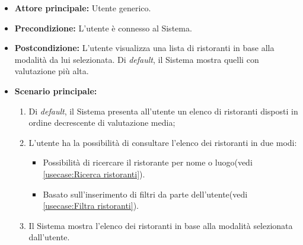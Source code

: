 \label{usecase:Visualizzazione elenco ristoranti}
\begin{itemize}
	\item \textbf{Attore principale:} Utente generico.

	\item \textbf{Precondizione:}
	      L'utente è connesso al Sistema.

	\item \textbf{Postcondizione:} L'utente visualizza una lista di ristoranti in base alla modalità da lui selezionata.
    Di \textit{default}, il Sistema mostra quelli con valutazione più alta.

	\item \textbf{Scenario principale:}
	      \begin{enumerate}
              \item Di \textit{default}, il Sistema presenta all'utente un elenco di ristoranti disposti in ordine decrescente di valutazione media;
              
		      \item L'utente ha la possibilità di consultare l'elenco dei ristoranti in due modi:
		      \begin{itemize}
                \item Possibilità di ricercare il ristorante per nome o luogo(vedi \autoref{usecase:Ricerca ristoranti}).
                \item Basato sull'inserimento di filtri da parte dell'utente(vedi \autoref{usecase:Filtra ristoranti}).
              \end{itemize}

		      \item Il Sistema mostra l'elenco dei ristoranti in base alla modalità selezionata dall'utente.
		    
	      \end{enumerate}
\end{itemize}

